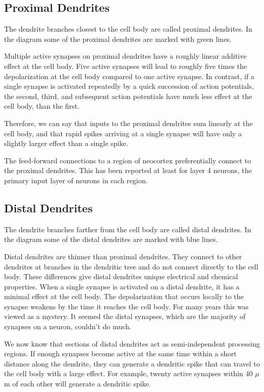 \subsection*{Proximal Dendrites}
The dendrite branches closest to the cell body are called proximal
dendrites. In the diagram some of the proximal dendrites are marked
with green lines.

Multiple active synapses on proximal dendrites have a roughly linear
additive effect at the cell body. Five active synapses will lead to
roughly five times the depolarization at the cell body compared to one
active synapse. In contrast, if a single synapse is activated
repeatedly by a quick succession of action potentials, the second,
third, and subsequent action potentials have much less effect at the
cell body, than the first.

Therefore, we can say that inputs to the proximal dendrites sum
linearly at the cell body, and that rapid spikes arriving at a single
synapse will have only a slightly larger effect than a single spike.

The feed-forward connections to a region of neocortex preferentially
connect to the proximal dendrites. This has been reported at least for
layer 4 neurons, the primary input layer of neurons in each region.

\subsection*{Distal Dendrites}
The dendrite branches farther from the cell body are called distal
dendrites. In the diagram some of the distal dendrites are marked with
blue lines.

Distal dendrites are thinner than proximal dendrites. They connect to
other dendrites at branches in the dendritic tree and do not connect
directly to the cell body. These differences give distal dendrites
unique electrical and chemical properties. When a single synapse is
activated on a distal dendrite, it has a minimal effect at the cell
body. The depolarization that occurs locally to the synapse weakens by
the time it reaches the cell body. For many years this was viewed as a
mystery. It seemed the distal synapses, which are the majority of
synapses on a neuron, couldn't do much.

We now know that sections of distal dendrites act as semi-independent
processing regions. If enough synapses become active at the same time
within a short distance along the dendrite, they can generate a
dendritic spike that can travel to the cell body with a large
effect. For example, twenty active synapses within 40 $\mu$m of each
other will generate a dendritic spike.

